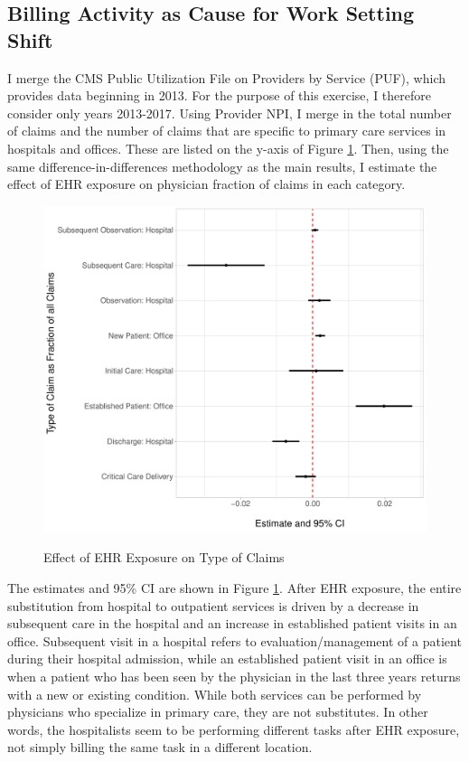 \documentclass[12pt]{article}
\begin{document}
\subsection{Billing Activity as Cause for Work Setting Shift}

I merge the CMS Public Utilization File on Providers by Service (PUF), which provides data beginning in 2013. For the purpose of this exercise, I therefore consider only years 2013-2017. Using Provider NPI, I merge in the total number of claims and the number of claims that are specific to primary care services in hospitals and offices. These are listed on the y-axis of Figure \ref{fig:claims_estimates}. Then, using the same difference-in-differences methodology as the main results, I estimate the effect of EHR exposure on physician fraction of claims in each category.

\begin{figure}
    \centering
    \caption{Effect of EHR Exposure on Type of Claims}
    \includegraphics[width=\textwidth]{Objects/claim_type_results.pdf}
    \label{fig:claims_estimates}
\end{figure}



The estimates and 95\% CI are shown in Figure \ref{fig:claims_estimates}. After EHR exposure, the entire substitution from hospital to outpatient services is driven by a decrease in subsequent care in the hospital and an increase in established patient visits in an office. Subsequent visit in a hospital refers to evaluation/management of a patient during their hospital admission, while an established patient visit in an office is when a patient who has been seen by the physician in the last three years returns with a new or existing condition. While both services can be performed by physicians who specialize in primary care, they are not substitutes. In other words, the hospitalists seem to be performing different tasks after EHR exposure, not simply billing the same task in a different location. 
\end{document}
